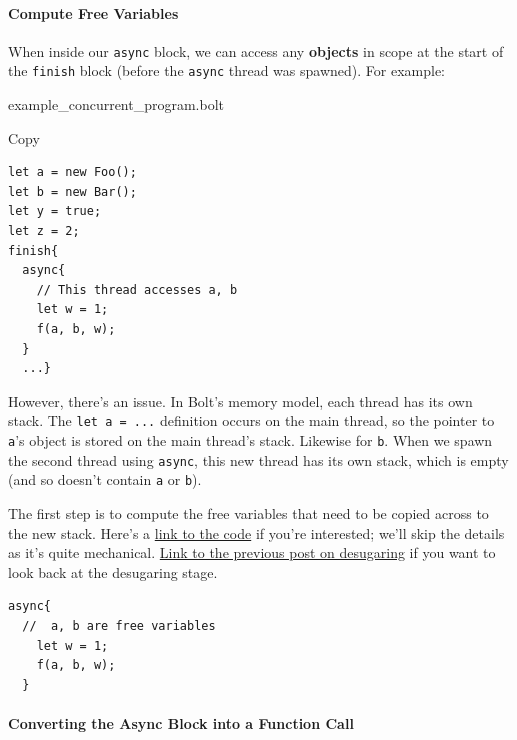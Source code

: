 \hypertarget{compute-free-variables}{%
\paragraph{\texorpdfstring{\protect\hyperlink{compute-free-variables}{}Compute
Free Variables}{Compute Free Variables}}\label{compute-free-variables}}

When inside our \texttt{async} block, we can access any \textbf{objects}
in scope at the start of the \texttt{finish} block (before the
\texttt{async} thread was spawned). For example:

{example\_concurrent\_program.bolt}

Copy

\begin{verbatim}
let a = new Foo();
let b = new Bar();
let y = true;
let z = 2;
finish{
  async{
    // This thread accesses a, b
    let w = 1;
    f(a, b, w);
  }
  ...}
\end{verbatim}

However, there's an issue. In Bolt's memory model, each thread has its
own stack. The \texttt{let\ a\ =\ ...} definition occurs on the main
thread, so the pointer to \texttt{a}'s object is stored on the main
thread's stack. Likewise for \texttt{b}. When we spawn the second thread
using \texttt{async}, this new thread has its own stack, which is empty
(and so doesn't contain \texttt{a} or \texttt{b}).

The first step is to compute the free variables that need to be copied
across to the new stack. Here's a
\href{https://github.com/mukul-rathi/bolt/blob/master/src/frontend/desugaring/desugar_expr.ml\#L140-L141}{link
to the code} if you're interested; we'll skip the details as it's quite
mechanical.
\href{https://mukulrathi.com/create-your-own-programming-language/lower-language-constructs-to-llvm/}{Link
to the previous post on desugaring} if you want to look back at the
desugaring stage.


\begin{verbatim}
async{
  //  a, b are free variables
    let w = 1;
    f(a, b, w);
  }
\end{verbatim}

\hypertarget{converting-the-async-block-into-a-function-call}{%
\paragraph{\texorpdfstring{\protect\hyperlink{converting-the-async-block-into-a-function-call}{}Converting
the Async Block into a Function
Call}{Converting the Async Block into a Function Call}}\label{converting-the-async-block-into-a-function-call}}

